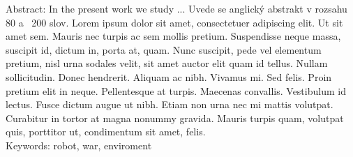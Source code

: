 \documentclass[12pt,notitlepage]{report}
\begin{document}
\noindent Abstract: In the present work we study ... Uvede se anglický abstrakt v rozsahu 80 a~ 200 slov. Lorem ipsum dolor sit amet, consectetuer adipiscing elit. Ut sit amet sem. Mauris nec turpis ac sem mollis pretium. Suspendisse neque massa, suscipit id, dictum in, porta at, quam. Nunc suscipit, pede vel elementum pretium, nisl urna sodales velit, sit amet auctor elit quam id tellus. Nullam sollicitudin. Donec hendrerit. Aliquam ac nibh. Vivamus mi. Sed felis. Proin pretium elit in neque. Pellentesque at turpis. Maecenas convallis. Vestibulum id lectus. Fusce dictum augue ut nibh. Etiam non urna nec mi mattis volutpat. Curabitur in tortor at magna nonummy gravida. Mauris turpis quam, volutpat quis, porttitor ut, condimentum sit amet, felis. \\


\noindent Keywords: robot, war, enviroment


\newpage
\end{document}
